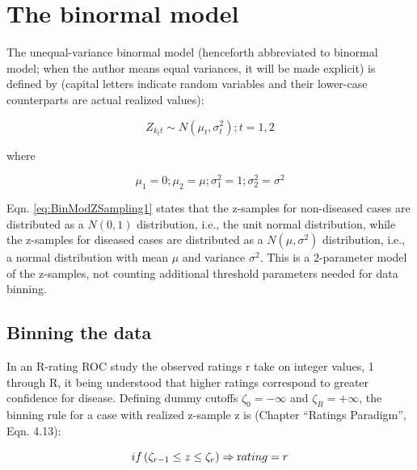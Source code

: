 \documentclass[
]{book}
\begin{document}
\hypertarget{BinModTheModel}{%
\section{The binormal model}\label{BinModTheModel}}

The unequal-variance binormal model (henceforth abbreviated to binormal model; when the author means equal variances, it will be made explicit) is defined by (capital letters indicate random variables and their lower-case counterparts are actual realized values):

\begin{equation} 
Z_{k_tt}\sim N\left ( \mu_t,\sigma_{t}^{2} \right );t=1,2
\label{eq:BinModZSampling1}
\end{equation}

where

\begin{equation} 
\mu_1=0;\mu_2=\mu;\sigma_{1}^{2}=1;\sigma_{2}^{2}=\sigma^{2}
\label{eq:BinModZSampling2}
\end{equation}

Eqn. \eqref{eq:BinModZSampling1} states that the z-samples for non-diseased cases are distributed as a \(N(0,1)\) distribution, i.e., the unit normal distribution, while the z-samples for diseased cases are distributed as a \(N(\mu,\sigma^2)\) distribution, i.e., a normal distribution with mean \(\mu\) and variance \(\sigma^2\). This is a 2-parameter model of the z-samples, not counting additional threshold parameters needed for data binning.

\hypertarget{binning-the-data}{%
\subsection{Binning the data}\label{binning-the-data}}

In an R-rating ROC study the observed ratings r take on integer values, 1 through R, it being understood that higher ratings correspond to greater confidence for disease. Defining dummy cutoffs \(\zeta_0 = -\infty\) and \(\zeta_R = +\infty\), the binning rule for a case with realized z-sample z is (Chapter ``Ratings Paradigm'', Eqn. 4.13):

\begin{equation} 
if \left (\zeta_{r-1} \le z \le \zeta_r  \right )\Rightarrow \text rating = r
\label{eq:BinModZBinning}
\end{equation}
\end{document}
